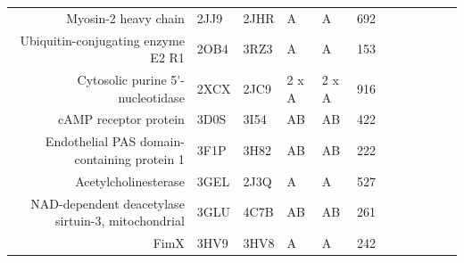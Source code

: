 \begin{table}
\begin{changemargin}{15mm}
\begin{scriptsize}
\begin{tabular}{ r p{0.8cm} p{0.8cm} p{0.8cm} p{0.8cm} l l l l l l l }
Myosin-2 heavy chain                                     & 2JJ9 & 2JHR & A     & A     & 692 & \cellcolor[rgb]{ .573,  .816,  .314} & \cellcolor[rgb]{ .573,  .816,  .314} & \cellcolor[rgb]{ .573,  .816,  .314} & \cellcolor[rgb]{ .573,  .816,  .314} & \cellcolor[rgb]{ .573,  .816,  .314} & \cellcolor[rgb]{ .573,  .816,  .314} \\
Ubiquitin-conjugating enzyme E2 R1                       & 2OB4 & 3RZ3 & A     & A     & 153 & \cellcolor[rgb]{ .573,  .816,  .314} & \cellcolor[rgb]{ .573,  .816,  .314} & \cellcolor[rgb]{ 1,  1,  0}          & \cellcolor[rgb]{ .573,  .816,  .314} & \cellcolor[rgb]{ .573,  .816,  .314} & \cellcolor[rgb]{ .573,  .816,  .314} \\
Cytosolic purine 5'-nucleotidase                         & 2XCX & 2JC9 & 2 x A & 2 x A & 916 & \cellcolor[rgb]{ .573,  .816,  .314} & \cellcolor[rgb]{ 1,  .494,  .475}    & \cellcolor[rgb]{ 1,  .494,  .475}    & \cellcolor[rgb]{ 1,  .494,  .475}    & \cellcolor[rgb]{ .573,  .816,  .314} & \cellcolor[rgb]{ 1,  .494,  .475}    \\
cAMP receptor protein                                    & 3D0S & 3I54 & AB    & AB    & 422 & \cellcolor[rgb]{ .573,  .816,  .314} & \cellcolor[rgb]{ .573,  .816,  .314} & \cellcolor[rgb]{ .573,  .816,  .314} & \cellcolor[rgb]{ .573,  .816,  .314} & \cellcolor[rgb]{ .573,  .816,  .314} & \cellcolor[rgb]{ .573,  .816,  .314} \\
Endothelial PAS domain-containing protein 1              & 3F1P & 3H82 & AB    & AB    & 222 & \cellcolor[rgb]{ 1,  .494,  .475}    & \cellcolor[rgb]{ .573,  .816,  .314} & \cellcolor[rgb]{ 1,  .494,  .475}    & \cellcolor[rgb]{ .573,  .816,  .314} & \cellcolor[rgb]{ .573,  .816,  .314} & \cellcolor[rgb]{ .573,  .816,  .314} \\
Acetylcholinesterase                                     & 3GEL & 2J3Q & A     & A     & 527 & \cellcolor[rgb]{ 1,  .494,  .475}    & \cellcolor[rgb]{ 1,  .494,  .475}    & \cellcolor[rgb]{ 1,  .494,  .475}    & \cellcolor[rgb]{ .573,  .816,  .314} & \cellcolor[rgb]{ .573,  .816,  .314} & \cellcolor[rgb]{ .573,  .816,  .314} \\
NAD-dependent deacetylase sirtuin-3, mitochondrial       & 3GLU & 4C7B & AB    & AB    & 261 & \cellcolor[rgb]{ .573,  .816,  .314} & \cellcolor[rgb]{ 1,  .494,  .475}    & \cellcolor[rgb]{ .573,  .816,  .314} & \cellcolor[rgb]{ .573,  .816,  .314} & \cellcolor[rgb]{ .573,  .816,  .314} & \cellcolor[rgb]{ .573,  .816,  .314} \\
FimX                                                     & 3HV9 & 3HV8 & A     & A     & 242 & \cellcolor[rgb]{ .573,  .816,  .314} & \cellcolor[rgb]{ .573,  .816,  .314} & \cellcolor[rgb]{ .573,  .816,  .314} & \cellcolor[rgb]{ .573,  .816,  .314} & \cellcolor[rgb]{ .573,  .816,  .314} & \cellcolor[rgb]{ .573,  .816,  .314} \\

\end{tabular}
\end{scriptsize}
\end{changemargin}
\end{table}
